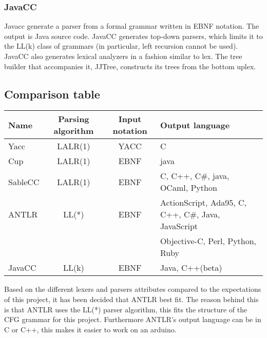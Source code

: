 \subsubsection{JavaCC}
Javacc generate a parser from a formal grammar written in EBNF notation. The output is Java source code. JavaCC generates top-down parsers, which limits it to the LL(k) class of grammars (in particular, left recursion cannot be used). JavaCC also generates lexical analyzers in a fashion similar to lex\citep{Javacc}. The tree builder that accompanies it, JJTree, constructs its trees from the bottom uplex\citep{JJTree}.


\subsection{Comparison table}
\begin{table}[H]
\begin{tabularx}{\textwidth}{|l|c|c|l|}
\hline
Name & Parsing algorithm & Input notation & Output language\\ \hline
Yacc & LALR(1) & YACC & C\\ \hline
Cup & LALR(1) & EBNF & java\\ \hline
SableCC & LALR(1) & EBNF & C, C++, C\#, java, OCaml, Python\\ \hline
ANTLR & LL(*) & EBNF & ActionScript, Ada95, C, C++, C\#, Java, JavaScript \\
~&~&~&Objective-C, Perl, Python, Ruby\\ \hline
JavaCC & LL(k) & EBNF & Java, C++(beta)\\ \hline
\end{tabularx}
\end{table}

Based on the different lexers and parsers attributes compared to the expectations of this project, it has been decided that ANTLR best fit. The reason behind this is that ANTLR uses the LL(*) parser algorithm, this fits the structure of the CFG grammar for this project. Furthermore ANTLR's output language can be in C or C++, this makes it easier to work on an arduino.
